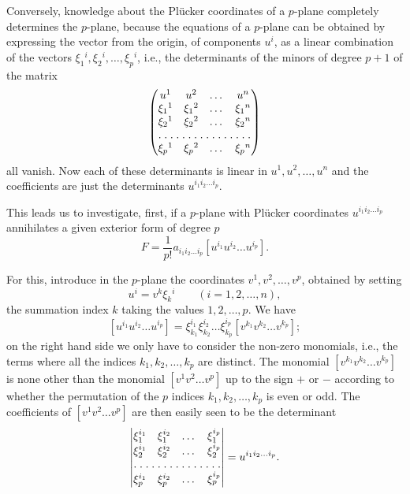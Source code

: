 \documentclass[leqno,11pt]{book}
\numberwithin{equation}{chapter}
\theoremstyle{shape1}
\theoremstyle{shape0}
\theoremstyle{shape2}
\theoremstyle{definition}
\begin{document}
Conversely, knowledge about the Pl\"ucker coordinates of a $p$-plane completely determines the $p$-plane, because the equations of a $p$-plane can be obtained by expressing the vector from the origin, of components $u^{i}$,  as a linear combination of the vectors $\xi_{1}{}^{i},\xi_{2}{}^{i},\dots,\xi_{p}{}^{i}$, {i.e.}, the determinants of the minors of degree $p+1$ of the matrix
\[
\begin{pmatrix}
  u^{1}&u^{2}&\dots&u^{n}\\
  \xi_{1}{}^{1}&\xi_{1}{}^{2}&\dots&\xi_{1}{}^{n}\\
  \xi_{2}{}^{1}&\xi_{2}{}^{2}&\dots&\xi_{2}{}^{n}\\
  \hdotsfor[1.5]{4}\\
  \xi_{p}{}^{1}&\xi_{p}{}^{2}&\dots&\xi_{p}{}^{n}\\
\end{pmatrix}
\]
all vanish. Now each of these determinants is linear in $u^{1},u^{2},\dots,u^{n}$ and the coefficients  are just the determinants $u^{i_{1}i_{2}\dots i_{p}}$.

\vspace{12pt}\fsec This leads us to investigate, first, if a $p$-plane with Pl\"ucker coordinates $u^{i_{1}i_{2}\dots i_{p}}$ annihilates a given exterior form of degree $p$
\[
F=\frac{1}{p!}a_{i_{1}i_{2}\dots i_{p}}[u^{i_{1}}u^{i_{2}}\dots u^{i_{p}}].
\]

For this, introduce in the $p$-plane the coordinates $v^{1},v^{2},\dots,v^{p}$,  obtained by setting
\[
u^{i}=v^{k}\xi_{k}{}^{i}\qquad (i=1,2,\dots,n),
\]
the summation index $k$ taking the values $1,2,\dots,p$. We have
\[
[u^{i_{1}}u^{i_{2}}\dots u^{i_{p}}]=\xi^{i_{1}}_{k_{1}}\xi^{i_{2}}_{k_{2}}\dots\xi^{i_{p}}_{k_{p}}[v^{k_{1}}v^{k_{2}}\dots v^{k_{p}}];
\]
on the right hand side we only have to consider the non-zero monomials, i.e., the terms where all the indices $k_{1},k_{2},\dots,k_{p}$ are distinct. The monomial $[v^{k_{1}}v^{k_{2}}\dots v^{k_{p}}]$ is none other than the monomial $[v^{1}v^{2}\dots v^{p}]$ up to the sign $+$ or $-$ according to whether the permutation of the $p$ indices $k_{1},k_{2},\dots,k_{p}$ is even or odd. The coefficients of $[v^{1}v^{2}\dots v^{p}]$ are then easily seen to be the determinant
\[
\begin{vmatrix}
  \xi_{1}^{i_{1}}&\xi_{1}^{i_{2}}&\dots&\xi_{1}^{i_{p}}\\
  \xi_{2}^{i_{1}}&\xi_{2}^{i_{2}}&\dots&\xi_{2}^{i_{p}}\\
  \hdotsfor[1.5]{4}\\
  \xi_{p}^{i_{1}}&\xi_{p}^{i_{2}}&\dots&\xi_{p}^{i_{p}}\\
\end{vmatrix}
=u^{i_{1}i_{2}\dots i_{p}}.
\]
\end{document}
